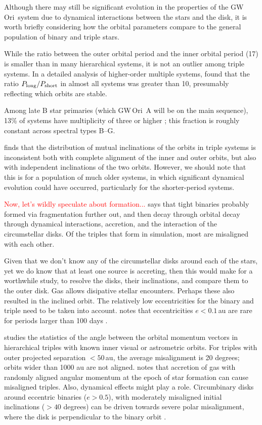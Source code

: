 \documentclass[twocolumn]{aastex61}
\newcommand{\todo}[1]{ \textcolor{red}{#1}}
\newcommand{\obj}{GW\,Ori}
\begin{document}
Although there may still be significant evolution in the properties of the \obj\ system due to dynamical interactions between the stars and the disk, it is worth briefly considering how the orbital parameters compare to the general population of binary and triple stars.

While the ratio between the outer orbital period and the inner orbital period (17) is smaller than in many hierarchical systems, it is not an outlier among triple systems.  In a detailed analysis of higher-order multiple systems, \citet{tokovinin97} found that the ratio $P_\mathrm{long} / P_{\rm short}$ in almost all systems was greater than 10, presumably reflecting which orbits are stable.

Among late B star primaries (which \obj~A will be on the main sequence), 13\% of systems have multiplicity of three or higher \citep{eggleton08}; this fraction is roughly constant across spectral types B--G.

\citet{tokovinin97} finds that the distribution of mutual inclinations of the orbits in triple systems is inconsistent both with complete alignment of the inner and outer orbits, but also with independent inclinations of the two orbits.  However, we should note that this is for a population of much older systems, in which significant dynamical evolution could have occurred, particularly for the shorter-period systems.


\todo{Now, let's wildly speculate about formation...}
\cite{bate12} says that tight binaries probably formed via fragmentation further out, and then decay through orbital decay through dynamical interactions, accretion, and the interaction of the circumstellar disks. Of the triples that form in simulation, most are misaligned with each other.

Given that we don't know any of the circumstellar disks around each of the stars, yet we do know that at least one source is accreting, then this would make for a worthwhile study, to resolve the disks, their inclinations, and compare them to the outer disk. Gas allows disipative stellar encounters. Perhaps these also resulted in the inclined orbit. The relatively low eccentricities for the binary and triple need to be taken into account. \citet{bate12} notes that eccentricities $e < 0.1\,$au are rare for periods larger than 100 days \citep{raghavan10}.

\citet{tokovinin17} studies the statistics of the angle between the orbital momentum vectors in hierarchical triples with known inner visual or astrometric orbits.  For triples with outer projected separation $< 50\,$au, the average misalignment is 20 degrees; orbits wider than 1000 au are not aligned. \citet{tokovinin17} notes that accretion of gas with randomly aligned angular momentum at the epoch of star formation can cause misaligned triples. Also, dynamical effects might play a role. Circumbinary disks around eccentric binaries ($e > 0.5$), with moderately misaligned initial inclinations ($>40$ degrees) can be driven towards severe polar misalignment, where the disk is perpendicular to the binary orbit \citep{martin17}.
\end{document}
